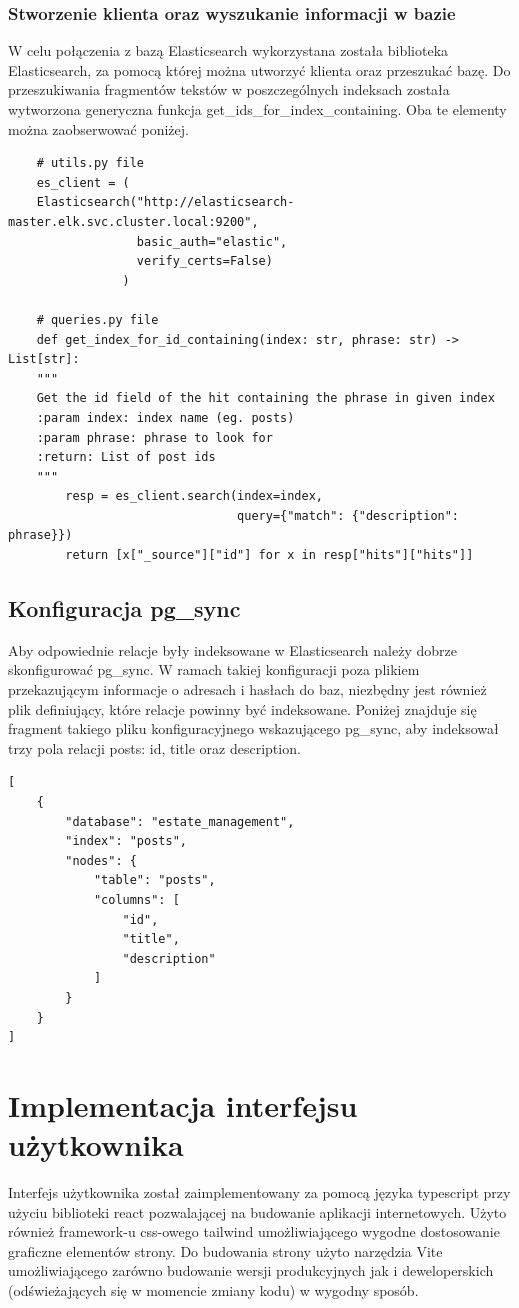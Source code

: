 \subsubsection{Stworzenie klienta oraz wyszukanie informacji w bazie}
W celu połączenia z bazą Elasticsearch wykorzystana została biblioteka Elasticsearch, za pomocą której można utworzyć klienta oraz przeszukać bazę. Do przeszukiwania fragmentów tekstów w poszczególnych indeksach została wytworzona generyczna funkcja get\_ids\_for\_index\_containing. Oba te elementy można zaobserwować poniżej.
\begin{verbatim}
    # utils.py file
    es_client = (
    Elasticsearch("http://elasticsearch-master.elk.svc.cluster.local:9200",
                  basic_auth="elastic",
                  verify_certs=False)
                )

    # queries.py file
    def get_index_for_id_containing(index: str, phrase: str) -> List[str]:
    """
    Get the id field of the hit containing the phrase in given index
    :param index: index name (eg. posts)
    :param phrase: phrase to look for
    :return: List of post ids
    """
        resp = es_client.search(index=index, 
                                query={"match": {"description": phrase}})
        return [x["_source"]["id"] for x in resp["hits"]["hits"]]
\end{verbatim}
\subsection{Konfiguracja pg\_sync}
Aby odpowiednie relacje były indeksowane w Elasticsearch należy dobrze skonfigurować pg\_sync. W ramach takiej konfiguracji poza plikiem przekazującym informacje o adresach i hasłach do baz, niezbędny jest również plik definiujący, które relacje powinny być indeksowane. Poniżej znajduje się fragment takiego pliku konfiguracyjnego wskazującego pg\_sync, aby indeksował trzy pola relacji posts: id, title oraz description.
\begin{verbatim}
[
    {
        "database": "estate_management",
        "index": "posts",
        "nodes": {
            "table": "posts",
            "columns": [
                "id",
                "title",
                "description"
            ]
        }
    }
]
\end{verbatim}



\newpage
\section{Implementacja interfejsu użytkownika}
Interfejs użytkownika został zaimplementowany za pomocą języka typescript przy użyciu  biblioteki react pozwalającej na budowanie aplikacji internetowych. Użyto również framework-u css-owego tailwind umożliwiającego wygodne dostosowanie graficzne elementów strony. Do budowania strony użyto narzędzia Vite umożliwiającego zarówno budowanie wersji produkcyjnych jak i deweloperskich (odświeżających się w momencie zmiany kodu) w wygodny sposób.
